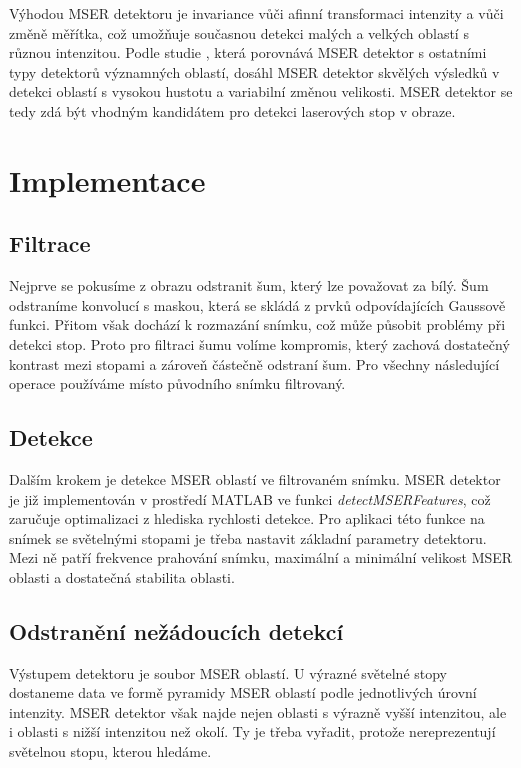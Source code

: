 Výhodou MSER detektoru je invariance vůči afinní transformaci intenzity a vůči změně měřítka, což umožňuje současnou detekci malých a velkých oblastí s různou intenzitou. Podle studie \cite{Comparison}, která porovnává MSER detektor s ostatními typy detektorů významných oblastí, dosáhl MSER detektor skvělých výsledků v detekci oblastí s vysokou hustotu a variabilní změnou velikosti. MSER detektor se tedy zdá být vhodným kandidátem pro detekci laserových stop v obraze.

\section*{Implementace}

\subsection*{Filtrace}
   Nejprve se pokusíme z obrazu odstranit šum, který lze považovat za bílý. Šum odstraníme konvolucí s maskou, která se skládá z prvků odpovídajících Gaussově funkci. Přitom však dochází k rozmazání snímku, což může působit problémy při detekci stop. Proto pro filtraci šumu volíme kompromis, který zachová dostatečný kontrast mezi stopami a zároveň částečně odstraní šum. Pro všechny následující operace používáme místo původního snímku filtrovaný.    

\subsection*{Detekce} 
   Dalším krokem je detekce MSER oblastí ve filtrovaném snímku. MSER detektor je již implementován v prostředí MATLAB ve funkci \textit{detectMSERFeatures}, což zaručuje optimalizaci z hlediska rychlosti detekce. Pro aplikaci této funkce na snímek se světelnými stopami je třeba nastavit základní parametry detektoru. Mezi ně patří frekvence prahování snímku, maximální a minimální velikost MSER oblasti a dostatečná stabilita oblasti. 

\subsection*{Odstranění nežádoucích detekcí}

Výstupem detektoru je soubor MSER oblastí. U výrazné světelné stopy dostaneme data ve formě pyramidy MSER oblastí podle jednotlivých úrovní intenzity. MSER detektor však najde nejen oblasti s výrazně vyšší intenzitou, ale i oblasti s nižší intenzitou než okolí. Ty je třeba vyřadit, protože nereprezentují světelnou stopu, kterou hledáme. 

